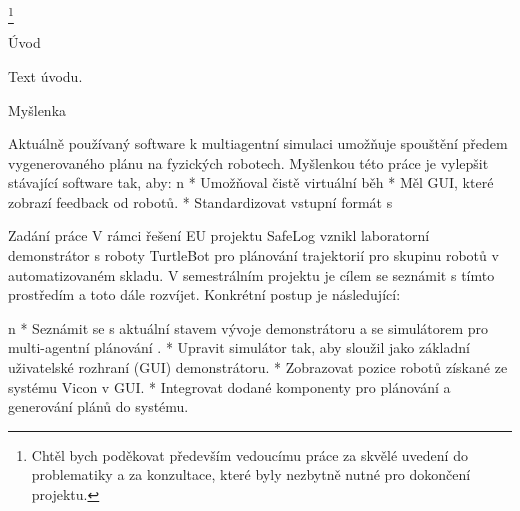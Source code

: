 

\thanks {Chtěl bych poděkovat především vedoucímu práce \kulich za skvělé uvedení do problematiky a za konzultace, které byly nezbytně nutné pro dokončení projektu.}
\makefront



\chap Úvod

Text úvodu.

\sec Myšlenka

Aktuálně používaný software k multiagentní simulaci umožňuje spouštění předem vygenerovaného plánu na fyzických robotech. Myšlenkou této práce je vylepšit stávající software tak, aby:
\begitems \style n
    * Umožňoval čistě virtuální běh
    * Měl GUI, které zobrazí feedback od robotů.
    * Standardizovat vstupní formát s \mapfIR
\enditems

\sec Zadání práce
V rámci řešení EU projektu SafeLog vznikl laboratorní demonstrátor s roboty TurtleBot pro plánování trajektorií pro skupinu robotů v automatizovaném skladu. V semestrálním projektu je cílem se seznámit s tímto prostředím a toto dále rozvíjet. Konkrétní postup je následující:


\begitems \style n
    * Seznámit se s aktuální stavem vývoje demonstrátoru a se simulátorem pro multi-agentní plánování \mapfIR.
    * Upravit simulátor tak, aby sloužil jako základní uživatelské rozhraní (GUI) demonstrátoru.
    * Zobrazovat pozice robotů získané ze systému Vicon v GUI.
    * Integrovat dodané komponenty pro plánování a generování plánů do systému.
\enditems
\bye
\endtt
